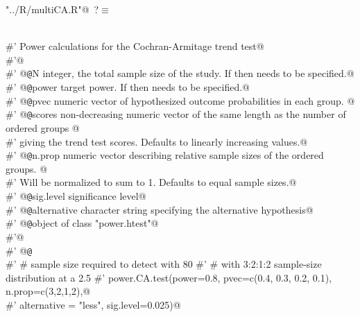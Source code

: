 \documentclass[reqno]{amsart}
\renewcommand{\NWtarget}[2]{\hypertarget{#1}{#2}}
\begin{document}
\begin{flushleft} \small\label{scrap23}\raggedright\small
\NWtarget{nuweb?}{} \verb@"../R/multiCA.R"@\nobreak\ {\footnotesize {?}}$\equiv$
\vspace{-1ex}
\begin{list}{}{} \item
\mbox{}\verb@@\\
\mbox{}\verb@#' Power calculations for the Cochran-Armitage trend test@\\
\mbox{}\verb@#'@\\
\mbox{}\verb@#' @{\tt @}\verb@param N integer, the total sample size of the study. If  then  needs to be specified.@\\
\mbox{}\verb@#' @{\tt @}\verb@param power target power. If  then  needs to be specified.@\\
\mbox{}\verb@#' @{\tt @}\verb@param pvec numeric vector of hypothesized outcome probabilities in each group. @\\
\mbox{}\verb@#' @{\tt @}\verb@param scores non-decreasing numeric vector of the same length as the number of ordered groups  @\\
\mbox{}\verb@#' giving the trend test scores. Defaults to linearly increasing values.@\\
\mbox{}\verb@#' @{\tt @}\verb@param n.prop numeric vector describing relative sample sizes of the ordered groups.  @\\
\mbox{}\verb@#' Will be normalized to sum to 1. Defaults to equal sample sizes.@\\
\mbox{}\verb@#' @{\tt @}\verb@param sig.level significance level@\\
\mbox{}\verb@#' @{\tt @}\verb@param alternative character string specifying the alternative hypothesis@\\
\mbox{}\verb@#' @{\tt @}\verb@return object of class "power.htest"@\\
\mbox{}\verb@#'@\\
\mbox{}\verb@#' @{\tt @}\verb@examples@\\
\mbox{}\verb@#' # sample size required to detect with 80% power a decreasing trend over 4 groups @\\
\mbox{}\verb@#' # with 3:2:1:2 sample-size distribution at a 2.5% significance level@\\
\mbox{}\verb@#' power.CA.test(power=0.8, pvec=c(0.4, 0.3, 0.2, 0.1), n.prop=c(3,2,1,2),@\\
\mbox{}\verb@#'               alternative = "less", sig.level=0.025)@\\

\end{list}
\end{flushleft}
\end{document}
